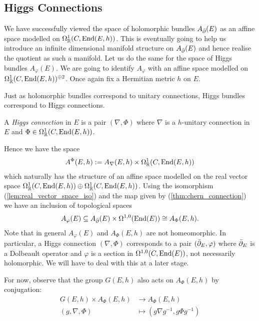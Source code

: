 \documentclass[12pt]{ociamthesis}  %
\begin{document}

\subsection{Higgs Connections}

We have successfully viewed the space of holomorphic bundles
$A_{\bar{\partial}} (E)$ as an affine space modelled on
$\Omega^1_{\mathbb{R}}(C,\operatorname{End}(E,h))$. This is eventually going
to help us introduce an infinite dimensional manifold structure on
$A_{\bar{\partial}} (E)$ and hence realise the quotient as such a manifold.
Let us do the same for the space of Higgs
bundles $A_\varphi(E)$. We are going to identify $A_\varphi$ with an affine
space modelled on $\Omega^1_{\mathbb{R}}(C,\operatorname{End}(E,h))^{\oplus 2}$.
Once again fix a Hermitian metric $h$ on $E$.

Just as holomorphic bundles correspond to unitary connections, Higgs bundles
correspond to Higgs connections.

\begin{definition}
  A \emph{Higgs connection} in $E$ is a pair $(\nabla,\Phi)$
  where $\nabla$ is a $h$-unitary connection in $E$ and
  $\Phi\in\Omega^1_{\mathbb{R}}(C,\operatorname{End}(E,h))$.
\end{definition}

Hence we have the space
\begin{align}\label{eq:Higgs_connections_space}
  A^{\Phi}(E,h) := A_\nabla(E,h) \times \Omega^1_{\mathbb{R}}(C,\operatorname{End}(E,h))
\end{align}
which naturally has the structure of an affine space modelled on
the real vector space
$\Omega^1_{\mathbb{R}}(C,\operatorname{End}(E,h))\oplus\Omega_{\mathbb{R}}^1(C,\operatorname{End}(E,h))$. Using the isomorphism (\ref{lem:real_vector_space_iso})
and the map given by (\ref{thm:chern_connection}) we have an inclusion
of topological spaces
\begin{align*}
  A_\varphi(E) \subseteq A_{\bar{\partial}} (E) \times \Omega^{1,0}(\operatorname{End}(E)) \cong A_\Phi (E,h).
\end{align*}
Note that in general $A_\varphi(E)$ and $A_\Phi (E,h)$ are not homeomorphic. In
particular, a Higgs connection $(\nabla,\Phi)$ corresponds to
a pair $({\bar{\partial}}_E,\varphi)$ where ${\bar{\partial}}_E$ is a Dolbeault operator and
$\varphi$ is a section in $\Omega^{1,0}(C,\operatorname{End}(E))$, not necessarily
holomorphic. We will have to deal with this at a later stage.

For now, observe that the group $G(E,h)$ also acts on $A_\Phi (E,h)$
by conjugation:
\begin{align*}
  G(E,h) \times A_\Phi (E,h) & \to A_\Phi (E,h)                        \\
  (g,\nabla,\Phi)            & \mapsto (g\nabla{g}^{-1},g\Phi{g}^{-1})
\end{align*}
\end{document}
